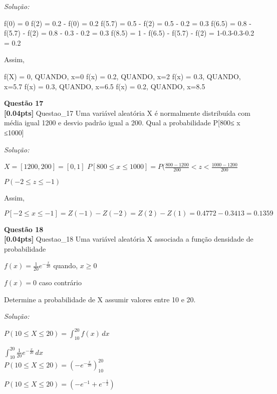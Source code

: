 \documentclass{article}
\newenvironment{problem}[2][Questão]
    { \begin{mdframed}[backgroundcolor=gray!20] \textbf{#1 #2} \\}
    {  \end{mdframed}}
\newenvironment{solution}
    {\textit{Solução:}}
    {}
\begin{document}
\begin{solution}

f(0) = 0
f(2) = 0.2 - f(0) = 0.2
f(5.7) = 0.5 - f(2) = 0.5 - 0.2 = 0.3
f(6.5) = 0.8 - f(5.7) - f(2) = 0.8 - 0.3 - 0.2 = 0.3
f(8.5) = 1 - f(6.5) - f(5.7) - f(2) = 1-0.3-0.3-0.2 = 0.2

Assim,

f(X) = 0,   QUANDO, x=0
f(x) = 0.2, QUANDO, x=2
f(x) = 0.3, QUANDO, x=5.7
f(x) = 0.3, QUANDO, x=6.5
f(x) = 0.2, QUANDO, x=8.5

\end{solution}

\begin{problem}{17}
\textbf{[0.04pts]} Questao\_17 Uma variável aleatória X é normalmente distribuída com média igual 1200 e desvio 
padrão igual a 200. Qual a probabilidade P[800≤ x ≤1000]
\end{problem}

\begin{solution}

$X = [1200, 200] = [0,1]$
$P[800 \leq x \leq 1000] = P(\frac{800-1200}{200} < z < \frac{1000 - 1200}{200}$

$P(-2 \leq z \leq -1)$

Assim,

$P[-2 \leq x \leq -1] = Z(-1) - Z(-2) = Z(2) - Z(1) = 0.4772 - 0.3413 = 0.1359$

\end{solution}

\begin{problem}{18}
\textbf{[0.04pts]} Questao\_18 Uma variável aleatória X associada a função densidade de probabilidade

$f(x) = \frac{1}{20}e^{-\frac{x}{20}}$ quando, $x \geq 0$

$f(x) = 0 $ caso contrário

Determine a probabilidade de X assumir valores entre 10 e 20.

\end{problem}

\begin{solution}

$P(10 \leq X \leq 20) = \int_{10}^{20} f(x) \, dx$

$\int_{10}^{20} \frac{1}{20} e^{-\frac{x}{20}} \, dx$ \\
$P(10 \leq X \leq 20) = (-e^{-\frac{x}{20}})_{10}^{20}$

$P(10 \leq X \leq 20) = (-e^{-1} + e^{-\frac{1}{2}})$

\end{solution}
\end{document}
